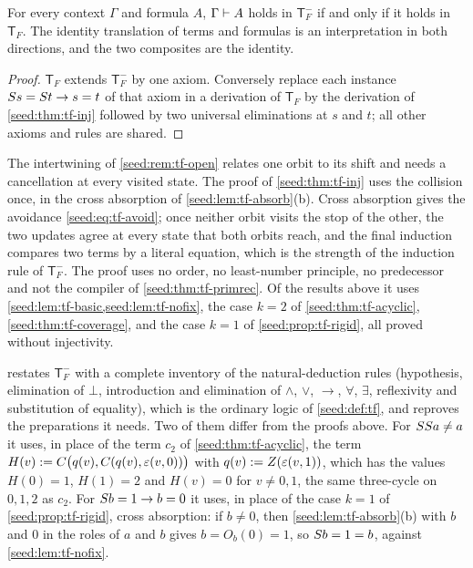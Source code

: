 \begin{corollary}\label{seed:cor:tf-same}
For every context $\Gamma$ and formula $A$, $\Gamma\vdash A$ holds in
$\mathsf{T}_F^{-}$ if and only if it holds in $\mathsf{T}_F$. The identity
translation of terms and formulas is an interpretation in both directions,
and the two composites are the identity.
\end{corollary}

\begin{proof}
$\mathsf{T}_F$ extends $\mathsf{T}_F^{-}$ by one axiom. Conversely replace
each instance $S s=S t\to s=t$ of that axiom in a derivation of
$\mathsf{T}_F$ by the derivation of \cref{seed:thm:tf-inj} followed by two
universal eliminations at $s$ and $t$; all other axioms and rules are
shared.
\end{proof}

\begin{remark}\label{seed:rem:tf-paired}
The intertwining of \cref{seed:rem:tf-open} relates one orbit to its shift
and needs a cancellation at every visited state. The proof of
\cref{seed:thm:tf-inj} uses the collision once, in the cross absorption of
\cref{seed:lem:tf-absorb}(b). Cross absorption gives the avoidance
\eqref{seed:eq:tf-avoid}; once neither orbit visits the stop of the other,
the two updates agree at every state that both orbits reach, and the
final induction compares two terms by a literal equation, which is the
strength of the induction rule of $\mathsf{T}_F^{-}$. The proof uses no
order, no least-number principle, no predecessor and not the compiler of
\cref{seed:thm:tf-primrec}. Of the results above it uses
\cref{seed:lem:tf-basic,seed:lem:tf-nofix}, the case $k=2$ of
\cref{seed:thm:tf-acyclic}, \cref{seed:thm:tf-coverage}, and the case $k=1$
of \cref{seed:prop:tf-rigid}, all proved without injectivity.
\end{remark}

\begin{remark}\label{seed:rem:tf-inj-pkg}
 restates $\mathsf{T}_F^{-}$ with a complete
inventory of the natural-deduction rules (hypothesis, elimination of
$\bot$, introduction and elimination of $\land$, $\lor$, $\to$, $\forall$,
$\exists$, reflexivity and substitution of equality), which is the ordinary
logic of \cref{seed:def:tf}, and reproves the preparations it needs. Two of
them differ from the proofs above. For $SS a\neq a$ it uses, in place
of the term $c_2$ of \cref{seed:thm:tf-acyclic}, the term
$H(v)\mathrel{:=} C\bigl(q(v),C(q(v),\varepsilon(v,0))\bigr)$ with
$q(v)\mathrel{:=} Z(\varepsilon(v,1))$, which has the values $H(0)=1$, $H(1)=2$ and
$H(v)=0$ for $v\neq0,1$, the same three-cycle on $0,1,2$ as $c_2$. For
$S b=1\to b=0$ it uses, in place of the case $k=1$ of
\cref{seed:prop:tf-rigid}, cross absorption: if $b\neq0$, then
\cref{seed:lem:tf-absorb}(b) with $b$ and $0$ in the roles of $a$ and $b$
gives $b=O_b(0)=1$, so $S b=1=b$, against \cref{seed:lem:tf-nofix}.
\end{remark}

